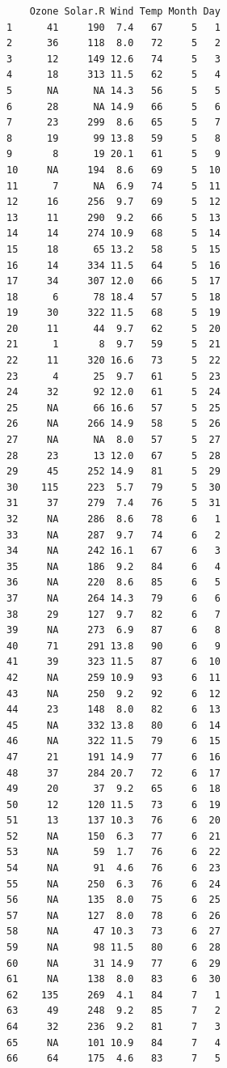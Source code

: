 \documentclass[
  letterpaper,
  DIV=11,
  numbers=noendperiod]{scrreprt}
\begin{document}
\begin{verbatim}
    Ozone Solar.R Wind Temp Month Day
1      41     190  7.4   67     5   1
2      36     118  8.0   72     5   2
3      12     149 12.6   74     5   3
4      18     313 11.5   62     5   4
5      NA      NA 14.3   56     5   5
6      28      NA 14.9   66     5   6
7      23     299  8.6   65     5   7
8      19      99 13.8   59     5   8
9       8      19 20.1   61     5   9
10     NA     194  8.6   69     5  10
11      7      NA  6.9   74     5  11
12     16     256  9.7   69     5  12
13     11     290  9.2   66     5  13
14     14     274 10.9   68     5  14
15     18      65 13.2   58     5  15
16     14     334 11.5   64     5  16
17     34     307 12.0   66     5  17
18      6      78 18.4   57     5  18
19     30     322 11.5   68     5  19
20     11      44  9.7   62     5  20
21      1       8  9.7   59     5  21
22     11     320 16.6   73     5  22
23      4      25  9.7   61     5  23
24     32      92 12.0   61     5  24
25     NA      66 16.6   57     5  25
26     NA     266 14.9   58     5  26
27     NA      NA  8.0   57     5  27
28     23      13 12.0   67     5  28
29     45     252 14.9   81     5  29
30    115     223  5.7   79     5  30
31     37     279  7.4   76     5  31
32     NA     286  8.6   78     6   1
33     NA     287  9.7   74     6   2
34     NA     242 16.1   67     6   3
35     NA     186  9.2   84     6   4
36     NA     220  8.6   85     6   5
37     NA     264 14.3   79     6   6
38     29     127  9.7   82     6   7
39     NA     273  6.9   87     6   8
40     71     291 13.8   90     6   9
41     39     323 11.5   87     6  10
42     NA     259 10.9   93     6  11
43     NA     250  9.2   92     6  12
44     23     148  8.0   82     6  13
45     NA     332 13.8   80     6  14
46     NA     322 11.5   79     6  15
47     21     191 14.9   77     6  16
48     37     284 20.7   72     6  17
49     20      37  9.2   65     6  18
50     12     120 11.5   73     6  19
51     13     137 10.3   76     6  20
52     NA     150  6.3   77     6  21
53     NA      59  1.7   76     6  22
54     NA      91  4.6   76     6  23
55     NA     250  6.3   76     6  24
56     NA     135  8.0   75     6  25
57     NA     127  8.0   78     6  26
58     NA      47 10.3   73     6  27
59     NA      98 11.5   80     6  28
60     NA      31 14.9   77     6  29
61     NA     138  8.0   83     6  30
62    135     269  4.1   84     7   1
63     49     248  9.2   85     7   2
64     32     236  9.2   81     7   3
65     NA     101 10.9   84     7   4
66     64     175  4.6   83     7   5

\end{verbatim}
\end{document}
